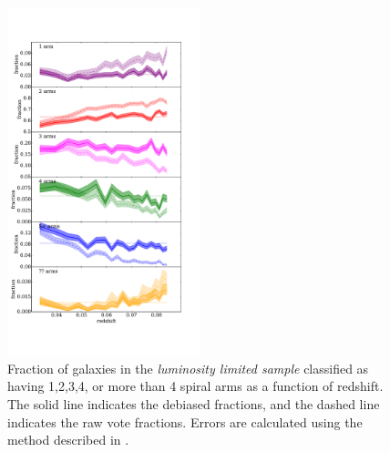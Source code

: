 \documentclass[useAMS,usenatbib]{mn2e}
\begin{document}
\begin{figure}
		\centering
		
        \includegraphics[width=0.5\textwidth]{Data_imgs/arm_number_with_z.pdf}
		
        \caption{Fraction of galaxies in the \textit{luminosity limited sample} classified as having 1,2,3,4, or more than 4 spiral arms as a function of redshift. The solid line indicates the debiased fractions, and the dashed line indicates the raw vote fractions. Errors are calculated using the method described in \citet{Cameron_11}.}
		
        \label{fig:arm_number_trend}
        
\end{figure}
\end{document}
